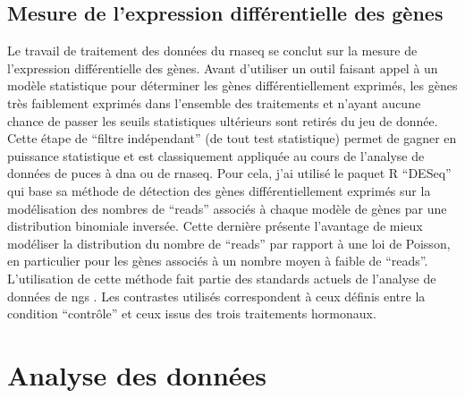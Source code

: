 \documentclass[../main.tex]{subfiles}
\begin{document}
	\subsection{Mesure de l'expression différentielle des gènes}\label{subsec:diff-expr-call}
		Le travail de traitement des données du \gls{rnaseq} se conclut sur la mesure de l'expression différentielle des gènes.
		Avant d'utiliser un outil faisant appel à un modèle statistique pour déterminer les gènes différentiellement exprimés, les gènes très faiblement exprimés dans l'ensemble des traitements et n'ayant aucune chance de passer les seuils statistiques ultérieurs sont retirés du jeu de donnée.
		Cette étape de ``filtre indépendant'' (de tout test statistique) permet de gagner en puissance statistique et est classiquement appliquée au cours de l'analyse de données de puces à \gls{dna} ou de \gls{rnaseq}.
		Pour cela, j'ai utilisé le paquet R ``DESeq'' \citep{Anders2010} qui base sa méthode de détection des gènes différentiellement exprimés sur la modélisation des nombres de ``reads'' associés à chaque modèle de gènes par une distribution binomiale inversée.
		Cette dernière présente l'avantage de mieux modéliser la distribution du nombre de ``reads'' par rapport à une loi de Poisson, en particulier pour les gènes associés à un nombre moyen à faible de ``reads''.
		L’utilisation de cette méthode fait partie des standards actuels de l’analyse de données de \gls{ngs} \citep{Anders2013}.
		Les contrastes utilisés correspondent à ceux définis entre la condition ``contrôle'' et ceux issus des trois traitements hormonaux.


\section{Analyse des données}
\end{document}
